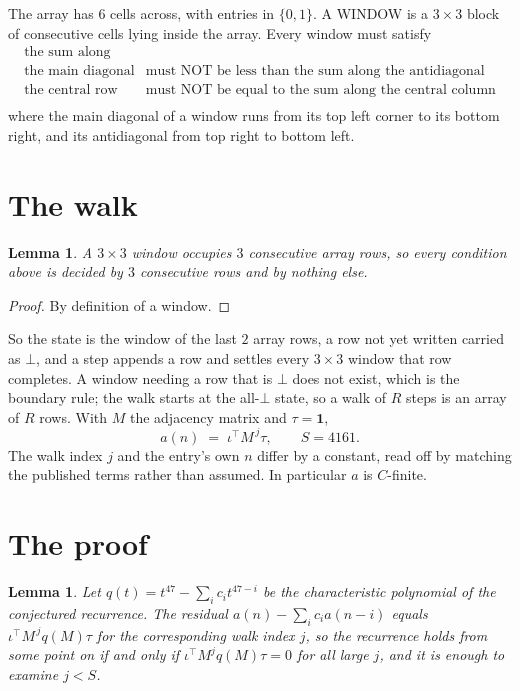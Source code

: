\documentclass[11pt,a4paper]{article}
\theoremstyle{plain}
\newtheorem{lemma}[theorem]{Lemma}
\theoremstyle{definition}
\begin{document}
The array has $6$ cells across, with entries in $\{0,1\}$. A WINDOW is a $3\times3$ block
of consecutive cells lying inside the array. Every window must satisfy
\[
\begin{array}{ll}
\text{the sum along} & \text{} \\[2pt]
\text{the main diagonal} & \text{must NOT be less than the sum along the antidiagonal} \\
\text{the central row} & \text{must NOT be equal to the sum along the central column} \\
\end{array}
\]
where the main diagonal of a window runs from its top left corner to its bottom right, and its
antidiagonal from top right to bottom left.

\section{The walk}

\begin{lemma}\label{lem:win}
A $3\times3$ window occupies $3$ consecutive array rows, so every condition above is
decided by $3$ consecutive rows and by nothing else.
\end{lemma}

\begin{proof}
By definition of a window.
\end{proof}

So the state is the window of the last $2$ array rows, a row not yet written carried as
$\bot$, and a step appends a row and settles every $3\times3$ window that row completes. A
window needing a row that is $\bot$ does not exist, which is the boundary rule; the walk starts
at the all-$\bot$ state, so a walk of $R$ steps is an array of $R$ rows. With $M$ the adjacency
matrix and $\tau=\mathbf{1}$,
\[
a(n)\;=\;\iota^{\!\top}M^{\,j}\tau ,\qquad S=4161.
\]
The walk index $j$ and the entry's own $n$ differ by a constant, read off by matching the
published terms rather than assumed. In particular $a$ is $C$-finite.

\section{The proof}

\begin{lemma}\label{lem:crit}
Let $q(t)=t^{47}-\sum_i c_it^{47-i}$ be the characteristic polynomial of the
conjectured recurrence. The residual $a(n)-\sum_ic_ia(n-i)$ equals
$\iota^{\!\top}M^{\,j}q(M)\tau$ for the corresponding walk index $j$, so the recurrence
holds from some point on if and only if $\iota^{\!\top}M^{j}q(M)\tau=0$ for all large $j$,
and it is enough to examine $j<S$.
\end{lemma}
\end{document}
